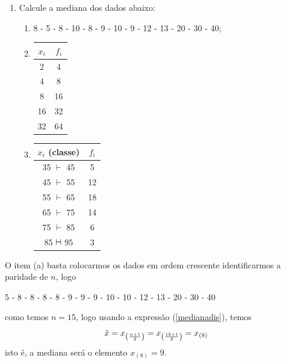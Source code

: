 \noindent \exemplo
\begin{enumerate}
    \item[(i)] Calcule a mediana dos dados abaixo:
    \begin{enumerate}
        \item[(a)] 8 - 5 - 8 - 10 - 8 - 9 - 10 - 9 - 12 - 13 - 20 - 30 - 40;
        \item[(b)] 
        \begin{center}
        \begin{tabular}{cc}
            \hline
            $x_i$ & $f_i$ \\
            \hline
            2  & 4  \\
            4  & 8  \\
            8  & 16 \\
            16 & 32 \\
            32 & 64 \\
            \hline
        \end{tabular}
        \end{center}

        \item[(c)] 
        \begin{center}
        \begin{tabular}{cc}
            \hline
            $x_i$ (classe) & $f_i$ \\
            \hline
            35 $\vdash$ 45 & 5  \\
            45 $\vdash$ 55 & 12 \\
            55 $\vdash$ 65 & 18 \\
            65 $\vdash$ 75 & 14 \\
            75 $\vdash$ 85 & 6  \\
            85 $\vdash\hspace{-0.2cm}\dashv$ 95 & 3 \\
            \hline
        \end{tabular}
        \end{center}
    \end{enumerate}
\end{enumerate}

\inic O item (a) basta colocarmos os dados em ordem crescente identificarmos a paridade de $n$, logo\\

\begin{center}
 5 - 8 - 8 - 8 - 8 - 9 - 9 - 9 - 10 - 10 - 12 - 13 - 20 - 30 - 40   
\end{center}
 como temos $ n = 15$, logo usando a expressão (\ref{medianadis}), temos
 $$
 \Tilde{x} = x_{\left(\frac{n+1}{2}\right)} = x_{\left(\frac{15+1}{2}\right)} = x_{(8)}
 $$
isto é, a mediana será o elemento $x_{(8)} = 9$.

